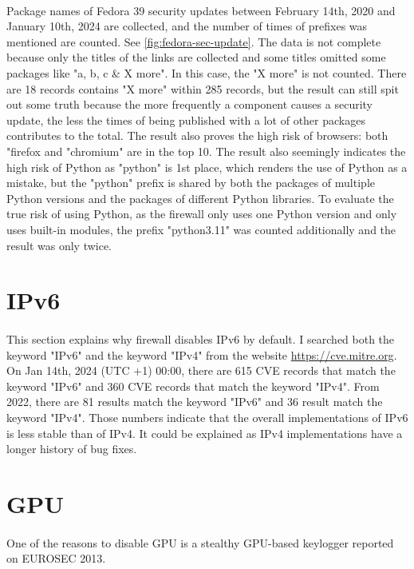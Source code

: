 \documentclass[mscthesis]{usiinfthesis}
\begin{document}
\paragraph{}
Package names of Fedora 39 security updates between February 14th, 2020 and January 10th, 2024 are collected, and the number of times of prefixes was mentioned are counted. See \cref{fig:fedora-sec-update}. The data is not complete because only the titles of the links are collected and some titles omitted some packages like "a, b, c \& X more". In this case, the "X more" is not counted. There are 18 records contains "X more" within 285 records, but the result can still spit out some truth because the more frequently a component causes a security update, the less the times of being published with a lot of other packages contributes to the total. The result also proves the high risk of browsers: both "firefox and "chromium" are in the top 10. The result also seemingly indicates the high risk of Python as "python" is 1st place, which renders the use of Python as a mistake, but the "python" prefix is shared by both the packages of multiple Python versions and the packages of different Python libraries. To evaluate the true risk of using Python, as the firewall only uses one Python version and only uses built-in modules, the prefix "python3.11" was counted additionally and the result was only twice.
\section{IPv6}
\paragraph{}
This section explains why firewall disables IPv6 by default. I searched both the keyword "IPv6" and the keyword "IPv4" from the website \url{https://cve.mitre.org}. On Jan 14th, 2024 (UTC +1) 00:00, there are 615 CVE records that match the keyword "IPv6" and 360 CVE records that match the keyword "IPv4". From 2022, there are 81 results match the keyword "IPv6" and 36 result match the keyword "IPv4". Those numbers indicate that the overall implementations of IPv6 is less stable than of IPv4. It could be explained as IPv4 implementations have a longer history of bug fixes.

\section{GPU}
\paragraph{}
One of the reasons to disable GPU is a stealthy GPU-based keylogger reported on EUROSEC 2013. \citep{gpu:keylogger}
\end{document}
